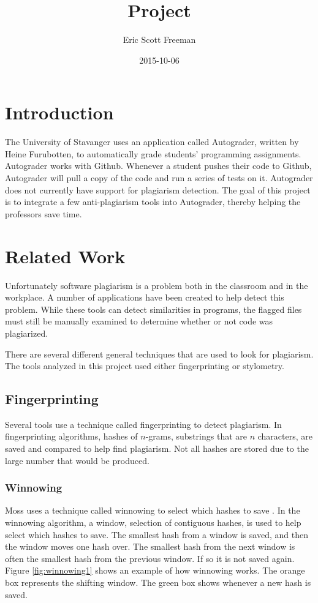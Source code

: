 \documentclass[12pt]{article}
\title{Project}
\date{2015-10-06}
\author{Eric Scott Freeman}
\begin{document}
	\maketitle
	\newpage
	\tableofcontents
	\newpage
	\section{Introduction}
		The University of Stavanger uses an application called Autograder, written by Heine Furubotten, to automatically grade students' programming assignments. Autograder works with Github. Whenever a student pushes their code to Github, Autograder will pull a copy of the code and run a series of tests on it. Autograder does not currently have support for plagiarism detection. The goal of this project is to integrate a few anti-plagiarism tools into Autograder, thereby helping the professors save time.
		
	\section{Related Work}
		Unfortunately software plagiarism is a problem both in the classroom and in the workplace. A number of applications have been created to help detect this problem. While these tools can detect similarities in programs, the flagged files must still be manually examined to determine whether or not code was plagiarized.
		
		There are several different general techniques that are used to look for plagiarism. The tools analyzed in this project used either fingerprinting or stylometry.
	
		\subsection{Fingerprinting}
			Several tools use a technique called fingerprinting to detect plagiarism. In fingerprinting algorithms, hashes of $n$-grams, substrings that are $n$ characters, are saved and compared to help find plagiarism. Not all hashes are stored due to the large number that would be produced. 
		
			\subsubsection{Winnowing}
				Moss uses a technique called winnowing to select which hashes to save \cite{schleimer+wilkerson+aiken}. In the winnowing algorithm, a window, selection of contiguous hashes, is used to help select which hashes to save. The smallest hash from a window is saved, and then the window moves one hash over. The smallest hash from the next window is often the smallest hash from the previous window. If so it is not saved again. Figure \ref{fig:winnowing1} shows an example of how winnowing works. The orange box represents the shifting window. The green box shows whenever a new hash is saved.
				
\end{document}
